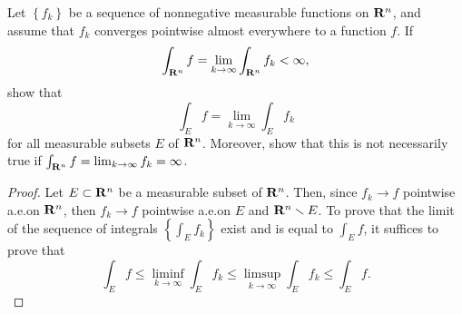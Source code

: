 \begin{problem}
Let $\left\{f_k\right\}$ be a sequence of nonnegative measurable functions
on $\mathbf{R}^n$, and assume that $f_k$ converges pointwise almost everywhere to
a function $f$. If
\[
\int_{\mathbf{R}^n} f=\lim_{k\to\infty}\int_{\mathbf{R}^n} f_k<\infty,
\]
show that
\[
\int_E f=\lim_{k\to\infty}\int_E f_k
\]
for all measurable subsets $E$ of $\mathbf{R}^n$. Moreover, show that this is not
necessarily true if $\int_{\mathbf{R}^n} f=\lim_{k\to\infty} f_k=\infty$.
\end{problem}
\begin{proof}
Let $E\subset\mathbf{R}^n$ be a measurable subset of $\mathbf{R}^n$. Then, since
$f_k\to f$ pointwise a.e.\@ on $\mathbf{R}^n$, then $f_k\to f$ pointwise a.e.\@ on
$E$ and $\mathbf{R}^n\smallsetminus E$. To prove that the limit of the sequence
of integrals $\left\{\int_Ef_k\right\}$ exist and is equal to $\int_E f$,
it suffices to prove that
\begin{equation}
  \label{eq:prep:2:6}
\int_E
f\leq\liminf_{k\to\infty}\int_Ef_k\leq\limsup_{k\to\infty}\int_Ef_k\leq\int_E f.
\end{equation}


\end{proof}
